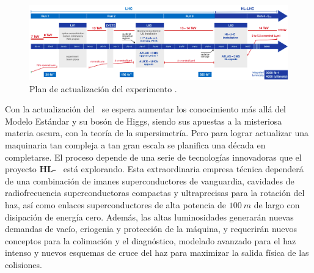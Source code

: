 \begin{figure}[h!]
\centering
\includegraphics[width=1\textwidth]{Analisis_y_Resultados/imagenes/CMS_upgrade.png}
\caption[Plan de actualización del experimento \LHC.]{Plan de actualización del experimento \LHC.\footnotemark}
\label{cms_actualiza}
\end{figure}


Con la actualización del \LHC ~se espera aumentar los conocimiento más allá del Modelo Estándar y su bosón de Higgs, siendo sus apuestas a la misteriosa materia oscura, con la teoría de la supersimetría. Pero para lograr actualizar una maquinaria tan compleja a tan gran escala se planifica una década en completarse. El proceso depende de una serie de tecnologías innovadoras que el proyecto \textbf{HL-}\LHC ~ está explorando. Esta extraordinaria empresa técnica dependerá de una combinación de imanes superconductores de vanguardia, cavidades de radiofrecuencia superconductoras compactas y ultraprecisas para la rotación del haz, así como enlaces superconductores de alta potencia de $100 ~m$ de largo con disipación de energía cero. Además, las altas luminosidades generarán nuevas demandas de vacío, criogenia y protección de la máquina, y requerirán nuevos conceptos para la colimación y el diagnóstico, modelado avanzado para el haz intenso y nuevos esquemas de cruce del haz para maximizar la salida física de las colisiones.



